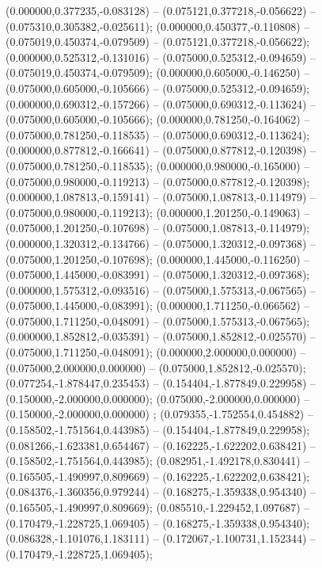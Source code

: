  (0.000000,0.377235,-0.083128) -- (0.075121,0.377218,-0.056622) -- (0.075310,0.305382,-0.025611);
 (0.000000,0.450377,-0.110808) -- (0.075019,0.450374,-0.079509) -- (0.075121,0.377218,-0.056622);
 (0.000000,0.525312,-0.131016) -- (0.075000,0.525312,-0.094659) -- (0.075019,0.450374,-0.079509);
 (0.000000,0.605000,-0.146250) -- (0.075000,0.605000,-0.105666) -- (0.075000,0.525312,-0.094659);
 (0.000000,0.690312,-0.157266) -- (0.075000,0.690312,-0.113624) -- (0.075000,0.605000,-0.105666);
 (0.000000,0.781250,-0.164062) -- (0.075000,0.781250,-0.118535) -- (0.075000,0.690312,-0.113624);
 (0.000000,0.877812,-0.166641) -- (0.075000,0.877812,-0.120398) -- (0.075000,0.781250,-0.118535);
 (0.000000,0.980000,-0.165000) -- (0.075000,0.980000,-0.119213) -- (0.075000,0.877812,-0.120398);
 (0.000000,1.087813,-0.159141) -- (0.075000,1.087813,-0.114979) -- (0.075000,0.980000,-0.119213);
 (0.000000,1.201250,-0.149063) -- (0.075000,1.201250,-0.107698) -- (0.075000,1.087813,-0.114979);
 (0.000000,1.320312,-0.134766) -- (0.075000,1.320312,-0.097368) -- (0.075000,1.201250,-0.107698);
 (0.000000,1.445000,-0.116250) -- (0.075000,1.445000,-0.083991) -- (0.075000,1.320312,-0.097368);
 (0.000000,1.575312,-0.093516) -- (0.075000,1.575313,-0.067565) -- (0.075000,1.445000,-0.083991);
 (0.000000,1.711250,-0.066562) -- (0.075000,1.711250,-0.048091) -- (0.075000,1.575313,-0.067565);
 (0.000000,1.852812,-0.035391) -- (0.075000,1.852812,-0.025570) -- (0.075000,1.711250,-0.048091);
 (0.000000,2.000000,0.000000) -- (0.075000,2.000000,0.000000) -- (0.075000,1.852812,-0.025570);
 (0.077254,-1.878447,0.235453) -- (0.154404,-1.877849,0.229958) -- (0.150000,-2.000000,0.000000);
 (0.075000,-2.000000,0.000000) -- (0.150000,-2.000000,0.000000) ;
 (0.079355,-1.752554,0.454882) -- (0.158502,-1.751564,0.443985) -- (0.154404,-1.877849,0.229958);
 (0.081266,-1.623381,0.654467) -- (0.162225,-1.622202,0.638421) -- (0.158502,-1.751564,0.443985);
 (0.082951,-1.492178,0.830441) -- (0.165505,-1.490997,0.809669) -- (0.162225,-1.622202,0.638421);
 (0.084376,-1.360356,0.979244) -- (0.168275,-1.359338,0.954340) -- (0.165505,-1.490997,0.809669);
 (0.085510,-1.229452,1.097687) -- (0.170479,-1.228725,1.069405) -- (0.168275,-1.359338,0.954340);
 (0.086328,-1.101076,1.183111) -- (0.172067,-1.100731,1.152344) -- (0.170479,-1.228725,1.069405);
